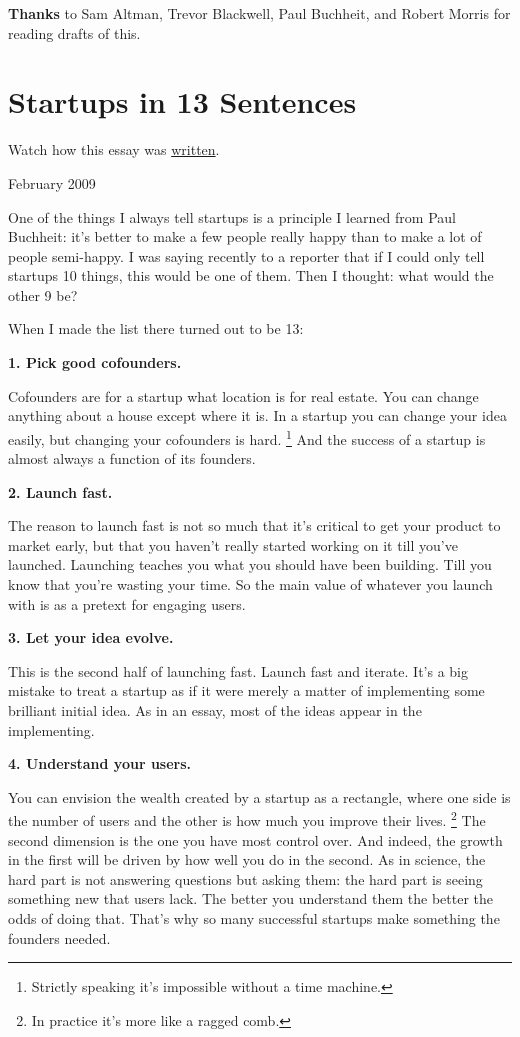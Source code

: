 \documentclass[12pt]{book}
\begin{document}
\textbf{Thanks} to Sam Altman, Trevor Blackwell, Paul Buchheit, and
Robert Morris for reading drafts of this.
\chapter{Startups in 13 Sentences}

Watch how this essay was
\href{https://byronm.com/13sentences.html}{written}.

February 2009

One of the things I always tell startups is a principle I learned from
Paul Buchheit: it's better to make a few people really happy than to
make a lot of people semi-happy. I was saying recently to a reporter
that if I could only tell startups 10 things, this would be one of them.
Then I thought: what would the other 9 be?

When I made the list there turned out to be 13:

\textbf{1. Pick good cofounders.}

Cofounders are for a startup what location is for real estate. You can
change anything about a house except where it is. In a startup you can
change your idea easily, but changing your cofounders is hard.
\footnote{Strictly speaking it's impossible without a time machine.} And the success of a startup is almost always a
function of its founders.

\textbf{2. Launch fast.}

The reason to launch fast is not so much that it's critical to get your
product to market early, but that you haven't really started working on
it till you've launched. Launching teaches you what you should have been
building. Till you know that you're wasting your time. So the main value
of whatever you launch with is as a pretext for engaging users.

\textbf{3. Let your idea evolve.}

This is the second half of launching fast. Launch fast and iterate. It's
a big mistake to treat a startup as if it were merely a matter of
implementing some brilliant initial idea. As in an essay, most of the
ideas appear in the implementing.

\textbf{4. Understand your users.}

You can envision the wealth created by a startup as a rectangle, where
one side is the number of users and the other is how much you improve
their lives. \footnote{In practice it's more like a ragged comb.} The second dimension is the one you
have most control over. And indeed, the growth in the first will be
driven by how well you do in the second. As in science, the hard part is
not answering questions but asking them: the hard part is seeing
something new that users lack. The better you understand them the better
the odds of doing that. That's why so many successful startups make
something the founders needed.
\end{document}
